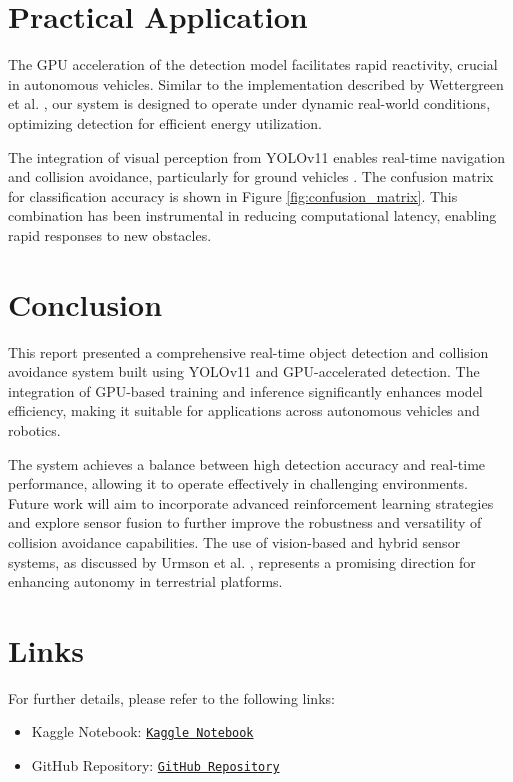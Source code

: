 \documentclass[12pt]{article}
\begin{document}
\section{Practical Application}
The GPU acceleration of the detection model facilitates rapid reactivity, crucial in autonomous vehicles. Similar to the implementation described by Wettergreen et al. \cite{wettergreen2005sun}, our system is designed to operate under dynamic real-world conditions, optimizing detection for efficient energy utilization.

The integration of visual perception from YOLOv11 enables real-time navigation and collision avoidance, particularly for ground vehicles \cite{whittaker2001robotic}. The confusion matrix for classification accuracy is shown in Figure \ref{fig:confusion_matrix}. This combination has been instrumental in reducing computational latency, enabling rapid responses to new obstacles.

\section{Conclusion}

This report presented a comprehensive real-time object detection and collision avoidance system built using YOLOv11 and GPU-accelerated detection. The integration of GPU-based training and inference significantly enhances model efficiency, making it suitable for applications across autonomous vehicles and robotics.

The system achieves a balance between high detection accuracy and real-time performance, allowing it to operate effectively in challenging environments. Future work will aim to incorporate advanced reinforcement learning strategies and explore sensor fusion to further improve the robustness and versatility of collision avoidance capabilities. The use of vision-based and hybrid sensor systems, as discussed by Urmson et al. \cite{urmson2006robust}, represents a promising direction for enhancing autonomy in terrestrial platforms.

\newpage
\appendix
\section{Links}

For further details, please refer to the following links:

\begin{itemize}
    \item Kaggle Notebook: \href{https://www.kaggle.com/code/sakibsadmanshajib/cav-object-detection/}{\texttt{Kaggle Notebook}}
    \item GitHub Repository: \href{https://github.com/sakibsadmanshajib/Real-Time-Object-Detection-for-Collision-Avoidance}{\texttt{GitHub Repository}}
\end{itemize}

\newpage


\end{document}
